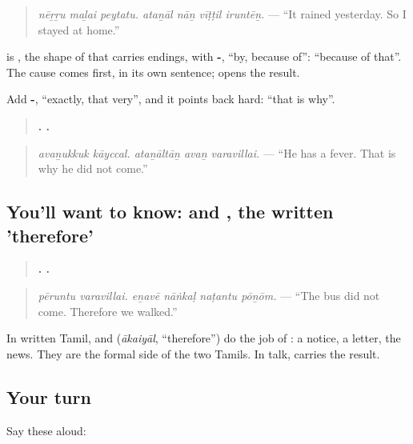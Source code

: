 \begin{quote}
\emph{nēṟṟu maḻai peytatu. ataṉāl nāṉ vīṭṭil iruntēṉ.} — \textquotedblleft{}It rained yesterday. So I stayed at home.\textquotedblright{}
\end{quote}

\textbf{} is \textbf{}, the shape of \textbf{} that carries endings, with \textbf{-}, \textquotedblleft{}by, because of\textquotedblright{}: \textquotedblleft{}because of that\textquotedblright{}. The cause comes first, in its own sentence; \textbf{} opens the result.

Add \textbf{-}, \textquotedblleft{}exactly, that very\textquotedblright{}, and it points back hard: \textquotedblleft{}that is why\textquotedblright{}.

\begin{quote}
\textbf{ .   .}
\end{quote}

\begin{quote}
\emph{avaṉukkuk kāyccal. ataṉāltāṉ avaṉ varavillai.} — \textquotedblleft{}He has a fever. That is why he did not come.\textquotedblright{}
\end{quote}

\subsection*{You'll want to know:  and , the written 'therefore'}
\begin{quote}
\textbf{ .    .}
\end{quote}

\begin{quote}
\emph{pēruntu varavillai. eṉavē nāṅkaḷ naṭantu pōṉōm.} — \textquotedblleft{}The bus did not come. Therefore we walked.\textquotedblright{}
\end{quote}

In written Tamil, \textbf{} and \textbf{} (\emph{ākaiyāl}, \textquotedblleft{}therefore\textquotedblright{}) do the job of \textbf{}: a notice, a letter, the news. They are the formal side of the two Tamils. In talk, \textbf{} carries the result.

\subsection*{Your turn}
Say these aloud:

